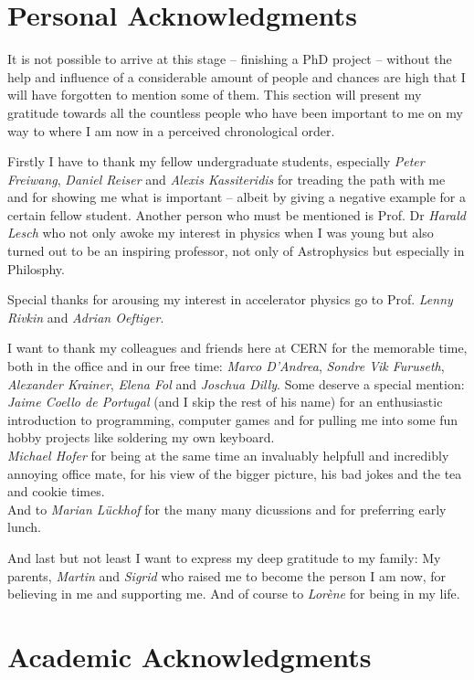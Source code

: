 \section*{Personal Acknowledgments}

It is not possible to arrive at this stage -- finishing a PhD project -- without the help and influence
of a considerable amount of people and chances are high that I will have forgotten to mention some of them.
This section will present my gratitude towards all the countless people who have been important to me
on my way to where I am now in a perceived chronological order.

Firstly I have to thank my fellow undergraduate students, especially \emph{Peter Freiwang}, \emph{Daniel Reiser} and
\emph{Alexis Kassiteridis} for treading the path with me and for showing me what is important
-- albeit by giving a negative example for a certain fellow student. Another person who must be
mentioned is Prof. Dr \emph{Harald Lesch} who not only awoke my interest in physics
when I was young but also turned out to be an inspiring professor, not only of Astrophysics but
especially in Philosphy.

Special thanks for arousing my interest in accelerator physics go to Prof. \emph{Lenny Rivkin} and
\emph{Adrian Oeftiger}.

I want to thank my colleagues and friends here at CERN for the memorable time, both in the office and
in our free time: \emph{Marco D'Andrea}, \emph{Sondre Vik Furuseth},
\emph{Alexander Krainer}, \emph{Elena Fol} and \emph{Joschua Dilly}.
Some deserve a special mention:\\
\emph{Jaime Coello de Portugal} (and I skip the rest of his name) for an enthusiastic introduction
to programming, computer games and for pulling me into some fun hobby projects like soldering my own
keyboard.\\
\emph{Michael Hofer} for being at the same time an invaluably helpfull and incredibly annoying
office mate, for his view of the bigger picture, his bad jokes and the tea and cookie times.\\
And to \emph{Marian Lückhof} for the many many dicussions and for preferring early lunch.

And last but not least I want to express my deep gratitude to my family: My parents, \emph{Martin}
and \emph{Sigrid} who raised me to become the person I am now, for believing in me and supporting me.
And of course to \emph{Lorène} for being in my life.

\clearpage
\section*{Academic Acknowledgments}


